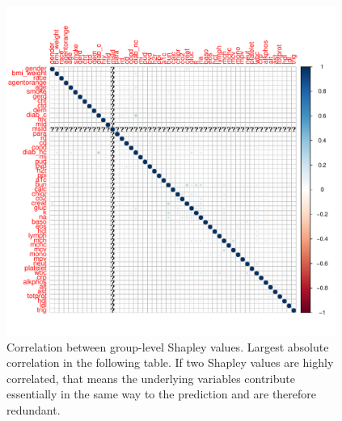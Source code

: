 \documentclass[12pt]{article}
\begin{document}
\begin{figure}[h]
\centering
\includegraphics[width=0.96\textwidth]{figures/shap_new/shap_corr.pdf}
\caption{Correlation between group-level Shapley values. Largest absolute correlation in the following table. If two Shapley values
are highly correlated, that means the underlying variables contribute essentially in the same way to the prediction and are therefore redundant.}
\end{figure}
\end{document}
